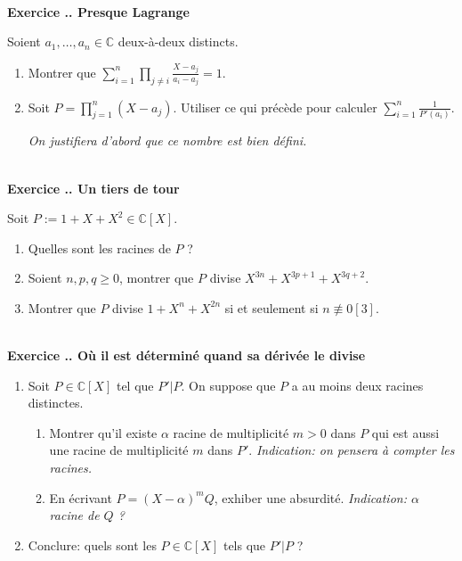 \documentclass{article}
\newcommand{\mb}[1]{\mathbb{#1}}
\newcounter{exo}
\newcommand{\exercice}[1][\null]{\textbf{\\ Exercice \thesection.\theexo. #1} \addtocounter{exo}{1}}
\begin{document}
\exercice[Presque Lagrange]

Soient $a_1, \dots, a_n \in \mb{C}$ deux-à-deux distincts.

\begin{enumerate}

\item Montrer que $\displaystyle \sum_{i=1}^n \prod_{j \neq i} \frac{X - a_j}{a_i - a_j} = 1$.

\item Soit $P = \prod_{j=1}^n (X-a_j)$. Utiliser ce qui précède pour calculer $\sum_{i=1}^n \frac{1}{P'(a_i)}$.

\emph{On justifiera d'abord que ce nombre est bien défini.}

\end{enumerate}



\exercice[Un tiers de tour]

Soit $P := 1 + X + X^2 \in \mb{C}[X]$.

\begin{enumerate}

\item Quelles sont les racines de $P$ ?

\item Soient $n,p,q \ge 0$, montrer que $P$ divise $X^{3n} + X^{3p+1} + X^{3q+2}$.

\item Montrer que $P$ divise $1 + X^{n} + X^{2n}$ si et seulement si $n \not \equiv 0 [3]$.

\end{enumerate}





\exercice[Où il est déterminé quand sa dérivée le divise]


\begin{enumerate}

\item Soit $P \in \mb{C}[X]$ tel que $P' | P$. On suppose que $P$ a au moins deux racines distinctes.

\begin{enumerate}

\item Montrer qu'il existe $\alpha$ racine de multiplicité $m>0$ dans $P$  qui est aussi une racine de multiplicité $m$ dans $P'$. \emph{Indication: on pensera à compter les racines.}

\item En écrivant $P = (X - \alpha)^m Q$, exhiber une absurdité. \emph{Indication: $\alpha$ racine de $Q$ ?}

\end{enumerate}

\item Conclure: quels sont les $P \in \mb{C}[X]$ tels que $P' | P$ ?


\end{enumerate}
\end{document}
